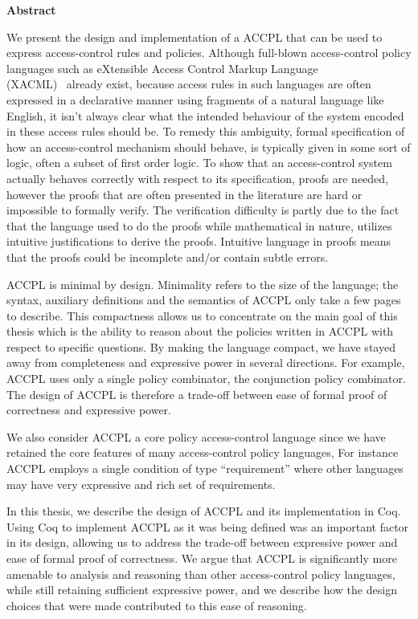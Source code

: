 
\begin{center}\textbf{Abstract}\end{center}

We present the design and implementation of a \ac{ACCPL} that can be used to express access-control rules and policies. Although full-blown access-control policy languages such as eXtensible Access Control Markup Language \\(XACML)~\cite{xacml} already exist, because access rules in such languages are often expressed in a declarative manner using fragments of a natural language like English, it isn't always clear what the intended behaviour of the system encoded in these access rules should be. To remedy this ambiguity, formal specification of how an access-control mechanism should behave, is typically given in some sort of logic, often a subset of first order logic. To show that an access-control system actually behaves correctly with respect to its specification, proofs are needed, however the proofs that are often presented in the literature are hard or impossible to formally verify. The verification difficulty is partly due to the fact that the language used to do the proofs while mathematical in nature, utilizes intuitive justifications to derive the proofs. Intuitive language in proofs means that the proofs could be incomplete and/or contain subtle errors.

\ac{ACCPL} is minimal by design. Minimality refers to the size of the language; the syntax, auxiliary definitions and the semantics of \ac{ACCPL} only take a few pages to describe. This compactness allows us to concentrate on the main goal of this thesis which is the ability to reason about the policies written in \ac{ACCPL} with respect to specific questions. By making the language compact, we have stayed away from completeness and expressive power in several directions. For example, \ac{ACCPL} uses only a single policy combinator, the conjunction policy combinator. The design of \ac{ACCPL} is therefore a trade-off between ease of formal proof of correctness and expressive power.

We also consider \ac{ACCPL} a core policy access-control language since we have retained the core features of many access-control policy languages, For instance \ac{ACCPL} employs a single condition of type ``requirement'' where other languages may have very expressive and rich set of requirements. 

In this thesis, we describe the design of ACCPL and its implementation in Coq.  Using Coq to implement ACCPL as it was being defined was an important factor in its design, allowing us to address the trade-off between expressive power and ease of formal proof of correctness. We argue that \ac{ACCPL} is significantly more amenable to analysis and reasoning than other access-control policy languages, while still retaining sufficient expressive power, and we describe how the design choices that were made contributed to this ease of reasoning. 

